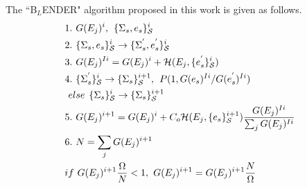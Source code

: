 \documentclass[twocolumn]{article}
\begin{document}
The ``B$_{L}$ENDER" algorithm proposed in this work  is given as follows. \\
\begin{equation}
\begin{split}
&1.\hspace{0.125cm} G(E_j)^i ,\hspace{0.15cm}  \{\Sigma_{s},e_s\}_{\mathcal{S}}^i\\
&2. \hspace{0.125cm}\{\Sigma_{s},e_s\}_{\mathcal{S}}^i \rightarrow  \{\Sigma_{s}^{'},e_s^{'}\}_{\mathcal{S}}^i\\
&3. \hspace{0.125cm}G(E_j)^{Ii} = G(E_j)^i + \mathcal{H}(E_j, \{e_{s}^{'}\}_{\mathcal{S}}^i) \\
&4. \hspace{0.125cm}\{\Sigma_{s}^{'}\}_{\mathcal{S}}^i \rightarrow \{\Sigma_{s}\}_{\mathcal{S}}^{i+1}, \hspace{0.15cm} P(1, G(e_s)^{Ii}/G(e_s^{'})^{Ii})\\
& \hspace{0.125cm}else  \hspace{0.15cm} \{\Sigma_{s}\}_{\mathcal{S}}^i \rightarrow \{\Sigma_{s}\}_{\mathcal{S}}^{i+1}\\
&5. \hspace{0.125cm} G(E_j)^{i+1} = G(E_j)^{i} + C_o\mathcal{H}(E_j, \{e_s\}_{\mathcal{S}}^{i+1})\frac{G(E_j)^{Ii}}{\sum_j G(E_j)^{Ii} }\\
&6. \hspace{0.125cm} N = \sum_j G(E_j)^{i+1} \hspace{0.125cm}\\
& if \hspace{0.125cm} G(E_j)^{i+1}\frac{\Omega}{N}  < 1, \hspace{0.125cm}  G(E_j)^{i+1} = G(E_j)^{i+1} \frac{N}{\Omega}
\end{split}
\end{equation}
\end{document}
